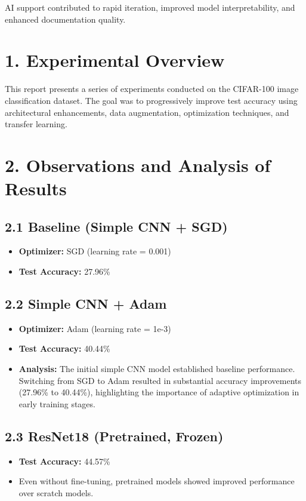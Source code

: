 \documentclass{article}
\begin{document}
\vspace{1em}
AI support contributed to rapid iteration, improved model interpretability, and enhanced documentation quality.

\section*{1. Experimental Overview}

This report presents a series of experiments conducted on the CIFAR-100 image classification dataset. The goal was to progressively improve test accuracy using architectural enhancements, data augmentation, optimization techniques, and transfer learning.

\section*{2. Observations and Analysis of Results}

\subsection*{2.1 Baseline (Simple CNN + SGD)}
\begin{itemize}
    \item \textbf{Optimizer:} SGD (learning rate = 0.001)
    \item \textbf{Test Accuracy:} 27.96\%

\end{itemize}

\subsection*{2.2 Simple CNN + Adam}
\begin{itemize}
    \item \textbf{Optimizer:} Adam (learning rate = 1e-3)
    \item \textbf{Test Accuracy:} 40.44\%
    \item \textbf{Analysis:}  The initial simple CNN model established baseline performance. Switching from SGD to Adam resulted in substantial accuracy improvements (27.96\% to 40.44\%), highlighting the importance of adaptive optimization in early training stages.

\end{itemize}

\subsection*{2.3 ResNet18 (Pretrained, Frozen)}
\begin{itemize}
    \item \textbf{Test Accuracy:} 44.57\%
    \item Even without fine-tuning, pretrained models showed improved performance over scratch models.
\end{itemize}
\end{document}
